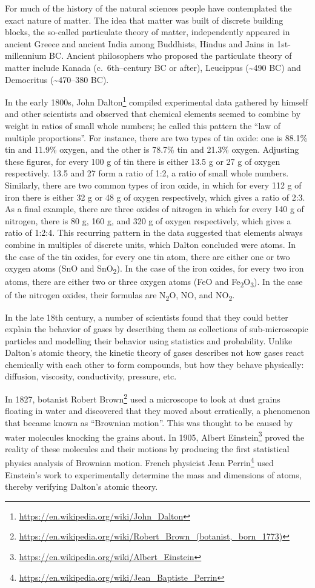 \documentclass[
]{article}
\let\rmarkdownfootnote\footnote%
\def\footnote{\protect\rmarkdownfootnote}
\renewcommand{\href}[2]{#2\footnote{\url{#1}}}
\theoremstyle{definition}
\theoremstyle{definition}
\theoremstyle{definition}
\theoremstyle{remark}
\begin{document}
For much of the history of the natural sciences people have contemplated
the exact nature of matter. The idea that matter was built of discrete
building blocks, the so-called particulate theory of matter,
independently appeared in ancient Greece and ancient India among
Buddhists, Hindus and Jains in 1st-millennium BC. Ancient philosophers
who proposed the particulate theory of matter include Kanada
(c.~6th--century BC or after), Leucippus (\textasciitilde490 BC) and
Democritus (\textasciitilde470--380 BC).

In the early 1800s,
\href{https://en.wikipedia.org/wiki/John_Dalton}{John Dalton} compiled
experimental data gathered by himself and other scientists and observed
that chemical elements seemed to combine by weight in ratios of small
whole numbers; he called this pattern the ``law of multiple
proportions''. For instance, there are two types of tin oxide: one is
88.1\% tin and 11.9\% oxygen, and the other is 78.7\% tin and 21.3\%
oxygen. Adjusting these figures, for every 100 g of tin there is either
13.5 g or 27 g of oxygen respectively. 13.5 and 27 form a ratio of 1:2,
a ratio of small whole numbers. Similarly, there are two common types of
iron oxide, in which for every 112 g of iron there is either 32 g or 48
g of oxygen respectively, which gives a ratio of 2:3. As a final
example, there are three oxides of nitrogen in which for every 140 g of
nitrogen, there is 80 g, 160 g, and 320 g of oxygen respectively, which
gives a ratio of 1:2:4. This recurring pattern in the data suggested
that elements always combine in multiples of discrete units, which
Dalton concluded were atoms. In the case of the tin oxides, for every
one tin atom, there are either one or two oxygen atoms (SnO and
SnO\textsubscript{2}). In the case of the iron oxides, for every two
iron atoms, there are either two or three oxygen atoms (FeO and
Fe\textsubscript{2}O\textsubscript{3}). In the case of the nitrogen
oxides, their formulas are N\textsubscript{2}O, NO, and
NO\textsubscript{2}.

In the late 18th century, a number of scientists found that they could
better explain the behavior of gases by describing them as collections
of sub-microscopic particles and modelling their behavior using
statistics and probability. Unlike Dalton's atomic theory, the kinetic
theory of gases describes not how gases react chemically with each other
to form compounds, but how they behave physically: diffusion, viscosity,
conductivity, pressure, etc.

In 1827, botanist
\href{https://en.wikipedia.org/wiki/Robert_Brown_(botanist,_born_1773)}{Robert
Brown} used a microscope to look at dust grains floating in water and
discovered that they moved about erratically, a phenomenon that became
known as ``Brownian motion''. This was thought to be caused by water
molecules knocking the grains about. In 1905,
\href{https://en.wikipedia.org/wiki/Albert_Einstein}{Albert Einstein}
proved the reality of these molecules and their motions by producing the
first statistical physics analysis of Brownian motion. French physicist
\href{https://en.wikipedia.org/wiki/Jean_Baptiste_Perrin}{Jean Perrin}
used Einstein's work to experimentally determine the mass and dimensions
of atoms, thereby verifying Dalton's atomic theory.
\end{document}
